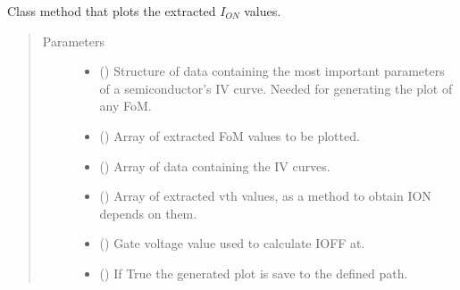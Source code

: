 \documentclass[letterpaper,10pt,english,openany, oneside]{sphinxmanual}
\begin{document}
\begin{fulllineitems}

\begin{fulllineitems}
\label{\detokenize{index:fompy.fom.ion_ext.plot}}
Class method that plots the extracted \(I_{ON}\) values.
\begin{quote}\begin{description}
\item[{Parameters}] \leavevmode\begin{itemize}
\item {} 
 () \textendash{} Structure of data containing the most important parameters of a semiconductor’s IV curve.
Needed for generating the plot of any FoM.

\item {} 
 () \textendash{} Array of extracted FoM values to be plotted.

\item {} 
 () \textendash{} Array of data containing the IV curves.

\item {} 
 () \textendash{} Array of extracted vth values, as a method to obtain ION depends on them.

\item {} 
 () \textendash{} Gate voltage value used to calculate IOFF at.

\item {} 
 () \textendash{} If True the generated plot is save to the defined path.

\end{itemize}

\end{description}\end{quote}


\end{fulllineitems}
\end{fulllineitems}
\end{document}
